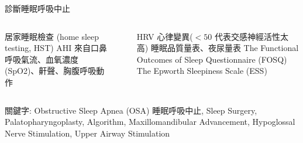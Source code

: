\documentclass[aspectratio=169]{beamer}
\begin{document}
\begin{frame}{診斷睡眠呼吸中止}
\begin{columns}
        \begin{outline}
        \1 居家睡眠檢查 (home sleep testing, HST)
        \2 AHI 來自口鼻呼吸氣流、血氧濃度(SpO2)、鼾聲、胸腹呼吸動作
        \end{outline}
~\\
~\\
~\\
~\\
~\\

        \begin{outline}
        \1 HRV 心律變異($\less 50$ 代表交感神經活性太高)
        \1 睡眠品質量表、夜尿量表
        \2 The Functional Outcomes of Sleep Questionnaire (FOSQ)
        \2 The Epworth Sleepiness Scale (ESS)
        \end{outline}

\end{columns}

    
\begin{block}{關鍵字:}
\footnotesize{
Obstructive Sleep Apnea (OSA) 睡眠呼吸中止, Sleep Surgery, Palatopharyngoplasty, Algorithm, Maxillomandibular Advancement, Hypoglossal Nerve Stimulation, Upper Airway Stimulation}  
    \end{block}


\end{frame}
\end{document}
